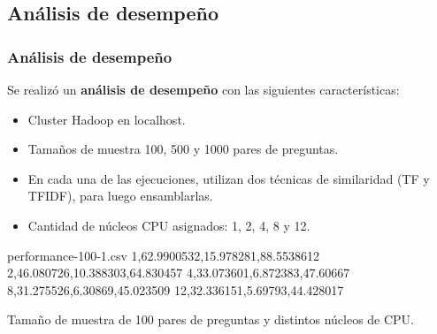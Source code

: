 \subsection{Análisis de desempeño}
\begin{frame}
	\frametitle{Análisis de desempeño}
	Se realizó un \textbf{análisis de desempeño} con las siguientes características:
	\bigskip
	\begin{itemize}[<*>]
		\item Cluster Hadoop en localhost.
		\item Tamaños de muestra 100, 500 y 1000 pares de preguntas.
		\item En cada una de las ejecuciones, utilizan dos técnicas de similaridad (TF y TFIDF), para luego ensamblarlas.
		\item Cantidad de núcleos CPU asignados: 1, 2, 4, 8 y 12.
	\end{itemize}

	\framebreak

	\begin{filecontents*}{performance-100-1.csv}
		1,62.9900532,15.978281,88.5538612
		2,46.080726,10.388303,64.830457
		4,33.073601,6.872383,47.60667
		8,31.275526,6.30869,45.023509
		12,32.336151,5.69793,44.428017
	\end{filecontents*}

	\footnotesize
	Tamaño de muestra de 100 pares de preguntas y distintos núcleos de CPU.
	\begin{figure}[h!]
		\centering
		\scriptsize
		\label{fig:performance100}
	\end{figure}


\end{frame}
